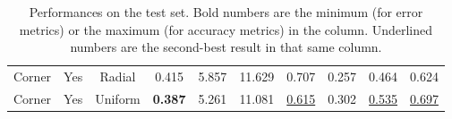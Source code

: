 \begin{table}
\begin{adjustwidth}{-.2cm}{-.2cm}
\begin{tabular}{c|c|c|c|c|c|c|c|c|c}
        Corner & Yes & Radial  &            0.415  &            5.857  &            11.629  &            0.707  &            0.257  &            0.464  &            0.624  \\
        Corner & Yes & Uniform &    \textbf{0.387} &            5.261  &            11.081  & \underline{0.615} &            0.302  & \underline{0.535} & \underline{0.697} \\
    \end{tabular}
    \end{adjustwidth}
    \caption{
        Performances on the test set.
        Bold numbers are the minimum (for error metrics) or the maximum (for accuracy metrics) in the column.
        Underlined numbers are the second-best result in that same column.
        \label{t:results}
    }
\end{table}

